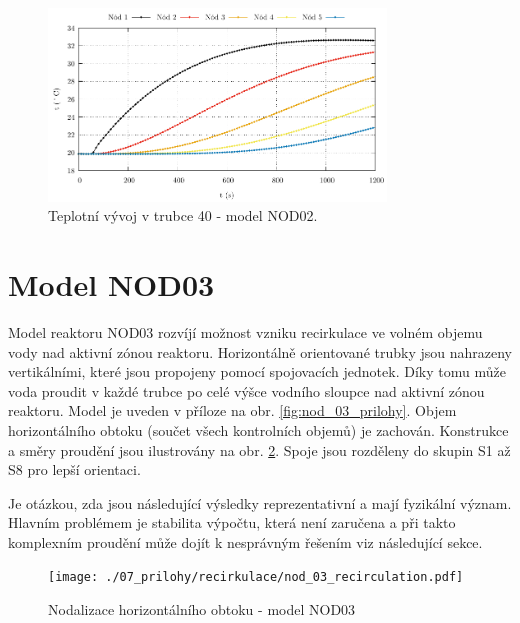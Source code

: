 \begin{figure}[H]
	\centering
	\includegraphics[width=0.8\textwidth]{./05_TH_model_VR_1/grafy/t_nod_02.pdf}
	\caption{Teplotní vývoj v trubce 40 - model NOD02.}
	\label{fig:nod_02_temp_pipe_40}
\end{figure}
\section{Model NOD03}
\label{sec:nod_03}
Model reaktoru NOD03 rozvíjí možnost vzniku recirkulace ve volném objemu vody nad aktivní zónou reaktoru. Horizontálně orientované trubky jsou nahrazeny vertikálními, které jsou propojeny pomocí spojovacích jednotek. Díky tomu může voda proudit v každé trubce po celé výšce vodního sloupce nad aktivní zónou reaktoru. Model je uveden v příloze na obr. \ref{fig:nod_03_prilohy}. Objem horizontálního obtoku (součet všech kontrolních objemů) je zachován. Konstrukce a směry proudění jsou ilustrovány na obr. \ref{fig:nod_03}. Spoje jsou rozděleny do skupin S1 až S8 pro lepší orientaci.

Je otázkou, zda jsou následující výsledky reprezentativní a mají fyzikální význam. Hlavním problémem je stabilita výpočtu, která není zaručena a při takto komplexním proudění může dojít k nesprávným řešením viz následující sekce.
  \begin{figure}[H]
 	\centering
 	\texttt{[image: ./07\_prilohy/recirkulace/nod\_03\_recirculation.pdf]}
 	\caption{Nodalizace horizontálního obtoku - model NOD03}
 	\label{fig:nod_03}
 \end{figure}
